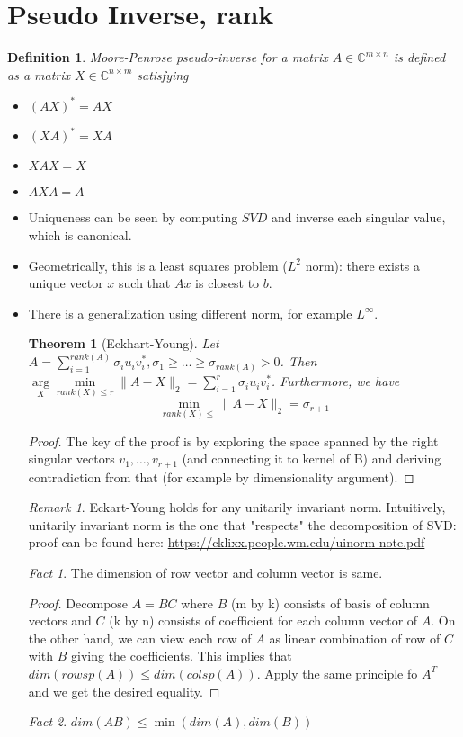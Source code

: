 \documentclass[11pt,reqno]{amsart}
\newtheorem{theorem}{Theorem}
\newtheorem{definition}{Definition}
\theoremstyle{remark}
\newtheorem{remark}[example]{Remark}
\newtheorem{fact}{Fact}
\begin{document}
\section{Pseudo Inverse, rank}
\begin{definition}
Moore-Penrose pseudo-inverse for a matrix $A\in \mathbb{C}^{m\times n}$ is defined as a matrix $X\in\mathbb{C}^{n\times m}$ satisfying
\begin{itemize}
\item $(AX)^*=AX$
\item $(XA)^* = XA$
\item $XAX=X$
\item $AXA=A$
\end{itemize}
\end{definition}
\begin{itemize}
\item Uniqueness can be seen by computing $SVD$ and inverse each singular value, which is canonical.
\item Geometrically, this is a least squares problem ($L^2$ norm): there exists a unique vector $x$ such that $Ax$ is closest to $b$.
\item There is a generalization using different norm, for example $L^\infty$.
\begin{theorem}[Eckhart-Young]
Let $A=\sum\limits^{rank(A)}_{i=1}\sigma_iu_iv_i^*, \sigma_1\geq\dots\geq\sigma_{rank(A)}>0$.
 Then $\arg\limits_X\min\limits_{rank(X)\leq r}\lVert A-X\rVert_2
 =\sum\limits^r_{i=1}\sigma_iu_iv_i^*$. Furthermore, we have 
\[
\min\limits_{rank(X)\leq}\lVert A-X\rVert_2=\sigma_{r+1}
\]
\end{theorem}
\begin{proof}
The key of the proof is by exploring the space spanned by the right
singular vectors $v_1,\dots,v_{r+1}$ (and connecting it to kernel 
of B) and deriving contradiction from that (for example by 
dimensionality argument).
\end{proof}
\begin{remark}
Eckart-Young holds for any unitarily invariant norm. Intuitively, unitarily invariant norm is the one that "respects" the decomposition of SVD: proof can be found here: \url{https://cklixx.people.wm.edu/uinorm-note.pdf}
\end{remark}
\begin{fact}
The dimension of row vector and column vector is same.
\end{fact}
\begin{proof}
Decompose $A=BC$ where $B$ (m by k) consists of basis of column 
vectors and $C$ (k by n) consists of coefficient for each column vector of $A$.
 On the other hand, we can view each row of $A$ as linear 
 combination of row of $C$ with $B$ giving the coefficients. 
 This implies that $dim(rowsp(A))\leq dim(colsp(A))$. Apply the same
  principle fo $A^T$ and we get the desired equality.
\end{proof}
\begin{fact}
$dim(AB)\leq \min (dim(A), dim(B))$
\end{fact}
\end{itemize}
\end{document}
